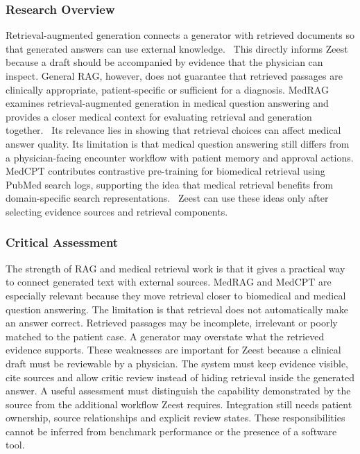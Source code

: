 \subsubsection{Research Overview}

Retrieval-augmented generation connects a generator with retrieved documents so that generated answers can use external knowledge.~\cite{zeestA:rag} This directly informs Zeest because a draft should be accompanied by evidence that the physician can inspect. General RAG, however, does not guarantee that retrieved passages are clinically appropriate, patient-specific or sufficient for a diagnosis. MedRAG examines retrieval-augmented generation in medical question answering and provides a closer medical context for evaluating retrieval and generation together.~\cite{zeestB:medrag} Its relevance lies in showing that retrieval choices can affect medical answer quality. Its limitation is that medical question answering still differs from a physician-facing encounter workflow with patient memory and approval actions. MedCPT contributes contrastive pre-training for biomedical retrieval using PubMed search logs, supporting the idea that medical retrieval benefits from domain-specific search representations.~\cite{zeestB:medcpt} Zeest can use these ideas only after selecting evidence sources and retrieval components.

\subsubsection{Critical Assessment}

The strength of RAG and medical retrieval work is that it gives a practical way to connect generated text with external sources. MedRAG and MedCPT are especially relevant because they move retrieval closer to biomedical and medical question answering. The limitation is that retrieval does not automatically make an answer correct. Retrieved passages may be incomplete, irrelevant or poorly matched to the patient case. A generator may overstate what the retrieved evidence supports. These weaknesses are important for Zeest because a clinical draft must be reviewable by a physician. The system must keep evidence visible, cite sources and allow critic review instead of hiding retrieval inside the generated answer. A useful assessment must distinguish the capability demonstrated by the source from the additional workflow Zeest requires. Integration still needs patient ownership, source relationships and explicit review states. These responsibilities cannot be inferred from benchmark performance or the presence of a software tool.

